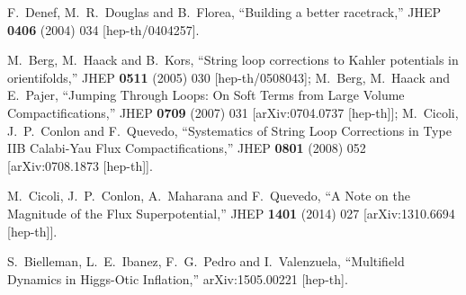 \documentclass[11pt,a4paper]{article}
\begin{document}
\begin{thebibliography}{99}
  F.~Denef, M.~R.~Douglas and B.~Florea,
  ``Building a better racetrack,''
  JHEP {\bf 0406} (2004) 034
  [hep-th/0404257].
	
M.~Berg, M.~Haack and B.~Kors,
  ``String loop corrections to Kahler potentials in orientifolds,''
  JHEP {\bf 0511} (2005) 030
  [hep-th/0508043];
M.~Berg, M.~Haack and E.~Pajer,
  ``Jumping Through Loops: On Soft Terms from Large Volume Compactifications,''
  JHEP {\bf 0709} (2007) 031
  [arXiv:0704.0737 [hep-th]];
  M.~Cicoli, J.~P.~Conlon and F.~Quevedo,
  ``Systematics of String Loop Corrections in Type IIB Calabi-Yau Flux Compactifications,''
  JHEP {\bf 0801} (2008) 052
  [arXiv:0708.1873 [hep-th]].

  M.~Cicoli, J.~P.~Conlon, A.~Maharana and F.~Quevedo,
  ``A Note on the Magnitude of the Flux Superpotential,''
  JHEP {\bf 1401} (2014) 027
  [arXiv:1310.6694 [hep-th]].

  S.~Bielleman, L.~E.~Ibanez, F.~G.~Pedro and I.~Valenzuela,
  ``Multifield Dynamics in Higgs-Otic Inflation,''
  arXiv:1505.00221 [hep-th].


  

  
  
  

  

\end{thebibliography}
\end{document}
